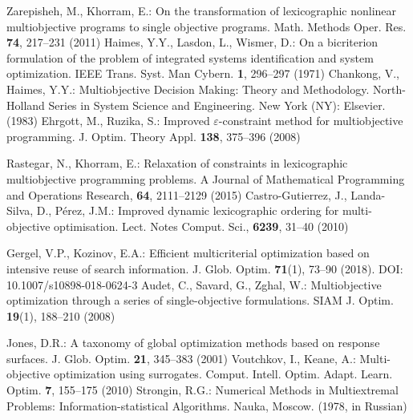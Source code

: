 \documentclass[smallextended]{svjour3}       %
\begin{document}
\begin{thebibliography}{}
 Zarepisheh, M., Khorram, E.: On the transformation of lexicographic nonlinear multiobjective  programs to single objective programs. Math. Methods Oper. Res. \textbf{74}, 217--231 (2011)
 Haimes, Y.Y., Lasdon, L., Wismer, D.: On a bicriterion formulation of the problem of integrated systems identification and system optimization. IEEE Trans. Syst. Man Cybern. \textbf{1}, 296--297 (1971)
 Chankong, V., Haimes, Y.Y.: Multiobjective Decision Making: Theory and Methodology. North-Holland Series in System Science and Engineering. New York (NY): Elsevier. (1983)
 Ehrgott, M., Ruzika, S.: Improved $\varepsilon$-constraint method for multiobjective programming. J. Optim. Theory Appl. \textbf{138}, 375--396 (2008)

 Rastegar, N., Khorram, E.: Relaxation of constraints in lexicographic multiobjective programming problems. A Journal of Mathematical Programming and Operations Research, \textbf{64}, 2111--2129 (2015)
 Castro-Gutierrez, J., Landa-Silva, D., P\'erez, J.M.: Improved dynamic lexicographic ordering for multi-objective optimisation. Lect. Notes Comput. Sci., \textbf{6239}, 31--40 (2010) 

 Gergel, V.P., Kozinov, E.A.: Efficient multicriterial optimization based on intensive reuse of search information.  J. Glob. Optim. \textbf{71}(1), 73--90 (2018). DOI: 10.1007/s10898-018-0624-3
 Audet, C., Savard, G., Zghal, W.: Multiobjective optimization through a series of single-objective formulations. SIAM J. Optim. \textbf{19}(1), 188--210 (2008)



 Jones, D.R.: A taxonomy of global optimization methods based on response surfaces. J. Glob. Optim. \textbf{21}, 345--383 (2001)
 Voutchkov, I., Keane, A.: Multi-objective optimization using surrogates. Comput. Intell. Optim. Adapt. Learn. Optim. \textbf{7}, 155--175 (2010)
 Strongin, R.G.: Numerical Methods in Multiextremal Problems: Information-statistical Algorithms. Nauka, Moscow. (1978, in Russian) 




\end{thebibliography}
\end{document}
